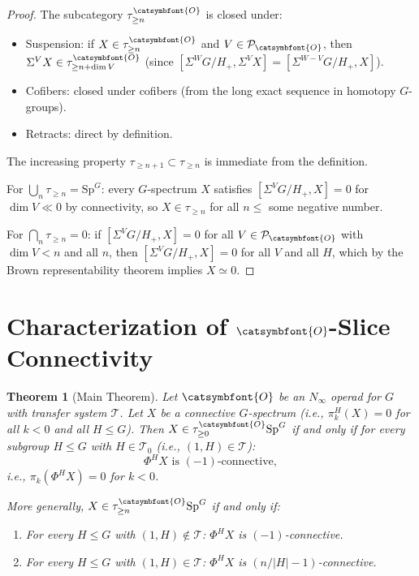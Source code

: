 \documentclass[12pt]{article}
\newtheorem{theorem}{Theorem}
\theoremstyle{definition}
\newcommand{\aO}{{\catsymbfont{O}}}
\begin{document}
\begin{proof}
The subcategory $\tau_{\geq n}^{\aO}$ is closed under:
\begin{itemize}
\item Suspension: if $X\in\tau_{\geq n}^{\aO}$ and $V\in\mathcal{P}_\aO$, then $\Sigma^V X\in\tau_{\geq n+\dim V}^{\aO}$ (since $[\Sigma^W G/H_+, \Sigma^V X] = [\Sigma^{W-V}G/H_+, X]$).
\item Cofibers: closed under cofibers (from the long exact sequence in homotopy $G$-groups).
\item Retracts: direct by definition.
\end{itemize}

The increasing property $\tau_{\geq n+1}\subset\tau_{\geq n}$ is immediate from the definition.

For $\bigcup_n\tau_{\geq n}=\mathrm{Sp}^G$: every $G$-spectrum $X$ satisfies $[\Sigma^V G/H_+,X]=0$ for $\dim V\ll 0$ by connectivity, so $X\in\tau_{\geq n}$ for all $n\leq$ some negative number.

For $\bigcap_n\tau_{\geq n}=0$: if $[\Sigma^V G/H_+,X]=0$ for all $V\in\mathcal{P}_\aO$ with $\dim V < n$ and all $n$, then $[\Sigma^V G/H_+,X]=0$ for all $V$ and all $H$, which by the Brown representability theorem implies $X\simeq 0$.
\end{proof}

\section{Characterization of $\aO$-Slice Connectivity}

\begin{theorem}[Main Theorem]\label{thm:main}
Let $\aO$ be an $N_\infty$ operad for $G$ with transfer system $\mathcal{T}$. Let $X$ be a connective $G$-spectrum (i.e., $\pi_k^H(X) = 0$ for all $k < 0$ and all $H\leq G$). Then $X\in\tau_{\geq 0}^{\aO}\mathrm{Sp}^G$ if and only if for every subgroup $H\leq G$ with $H\in\mathcal{T}_0$ (i.e., $(1,H)\in\mathcal{T}$):
$$\Phi^H X\text{ is }(-1)\text{-connective},$$
i.e., $\pi_k(\Phi^H X) = 0$ for $k < 0$.

More generally, $X\in\tau_{\geq n}^{\aO}\mathrm{Sp}^G$ if and only if:
\begin{enumerate}
\item[(a)] For every $H\leq G$ with $(1,H)\notin\mathcal{T}$: $\Phi^H X$ is $(-1)$-connective.
\item[(b)] For every $H\leq G$ with $(1,H)\in\mathcal{T}$: $\Phi^H X$ is $(n/|H|-1)$-connective.
\end{enumerate}
\end{theorem}
\end{document}
